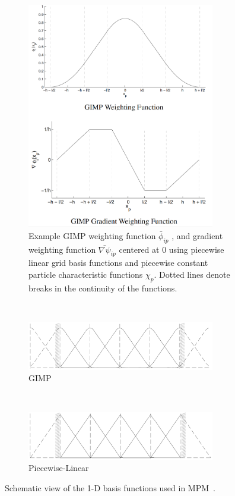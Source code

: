 \begin{figure}[tbhp]
	\centering
	\begin{subfigure}[b]{0.7\textwidth}
	\centering
	\includegraphics[width=0.9\textwidth]{gimp}
	\caption{Example GIMP weighting function $\bar{\phi}_{ip}$ ,
	and gradient weighting function $\bar{\nabla\psi}_{ip}$ centered at 0 using 
	piecewise linear grid basis functions and piecewise constant particle 
	characteristic functions $\chi_p$. Dotted lines denote breaks in the 
	continuity
	of the functions.}
	\label{fig:gimp}
	\end{subfigure}\\
	\begin{subfigure}[b]{0.9\textwidth}
		\centering
		\includegraphics[width=0.9\textwidth]{GIMP_function}
		\caption{GIMP}
		\label{fig:GIMP_function}
	\end{subfigure}\\
	\begin{subfigure}[b]{0.9\textwidth}
		\centering
		\includegraphics[width=0.9\textwidth]{MPM_Linear}
		\caption{Piecewise-Linear}
		\label{fig:MPM_Linear}
	\end{subfigure} 
	\caption{Schematic view of the 1-D basis functions used in 
	MPM~\citep{Steffen2008}.}
	\label{fig:MPM_GIMP_func}
\end{figure}

